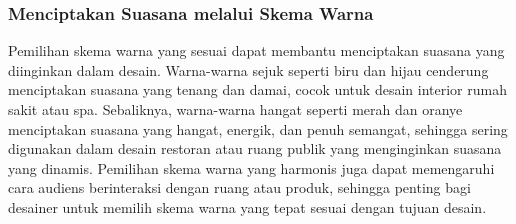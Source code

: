 \documentclass[a4paper]{article}
\begin{document}
\subsubsection{Menciptakan Suasana melalui Skema Warna}
Pemilihan skema warna yang sesuai dapat membantu menciptakan suasana yang diinginkan dalam desain. Warna-warna sejuk seperti biru dan hijau cenderung menciptakan suasana yang tenang dan damai, cocok untuk desain interior rumah sakit atau spa. Sebaliknya, warna-warna hangat seperti merah dan oranye menciptakan suasana yang hangat, energik, dan penuh semangat, sehingga sering digunakan dalam desain restoran atau ruang publik yang menginginkan suasana yang dinamis. Pemilihan skema warna yang harmonis juga dapat memengaruhi cara audiens berinteraksi dengan ruang atau produk, sehingga penting bagi desainer untuk memilih skema warna yang tepat sesuai dengan tujuan desain.
\end{document}
